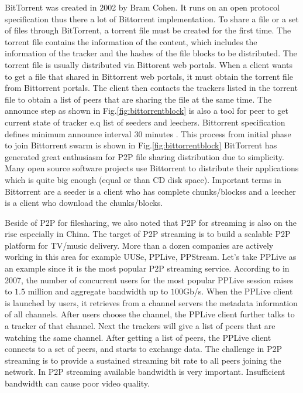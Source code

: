 BitTorrent was created in 2002 by Bram Cohen. 
It runs on an open protocol specification thus there a lot of Bittorrent implementation.
To share a file or a set of files through BitTorrent, a torrent file must be created for the first time.  
The torrent file contains the information of the content, which includes the information of the tracker and the hashes of the file blocks to be distributed.
The torrent file is usually distributed via Bittorent web portals.
When a client wants to get a file that shared in Bittorrent web portals, it must obtain the torrent file from Bittorrent portals.
The client then contacts the trackers listed in the torrent file to obtain a list of peers that are sharing the file at the same time.  
The announce step as shown in Fig.\ref{fig:bittorrentblock} is also a tool for peer to get current state of tracker e.q list of seeders and leechers.
Bittorrent specification defines minimum announce interval 30 minutes \cite{torrentspec}.
This process from initial phase to join Bittorrent swarm is shown in Fig.\ref{fig:bittorrentblock}
BitTorrent has generated great enthusiasm for P2P file sharing distribution due to simplicity.  
Many open source software projects use Bittorrent to distribute their applications which is quite big enough (equal or than CD disk space).
Important terms in Bittorrent are a seeder is a client who has complete chunks/blockss and a leecher is a client who download the chunks/blocks.

Beside of P2P for filesharing, we also noted that P2P for streaming is also on the rise especially in China.
The target of P2P streaming is to build a scalable P2P platform for TV/music delivery. 
More than a dozen companies are actively working in this area for example UUSe, PPLive, PPStream.  
Let's take PPLive as an example since it is the most popular P2P streaming service.
According to \cite{4378423} in 2007, the number of concurrent users for the most popular PPLive session raises to $1.5$ million and aggregate bandwidth up to $100$Gb/s.
When the PPLive client is launched by users, it retrieves from a channel servers the metadata information of all channels. 
After users choose the channel, the PPLive client further talks to a tracker of that channel. 
Next the trackers will give  a list of peers that are watching the same channel. 
After getting a list of peers, the PPLive client connects to a set of peers, and starts to exchange data. 
The challenge in P2P streaming is to provide a sustained streaming bit rate to all peers joining the network. 
In P2P streaming available bandwidth is very important.  
Insufficient bandwidth can cause poor video quality.  

